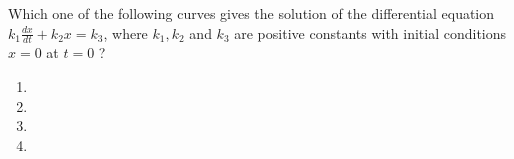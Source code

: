     \item Which one of the following curves gives the solution of the differential equation $k_1 \frac{dx}{dt} + k_2 x = k_3$, where $k_1,k_2$ and $k_3$ are positive constants with initial conditions $x=0$ at $t=0$ ?
    \begin{enumerate}
	    \item 
        \item 
        \item 
        \item 
    \end{enumerate}

